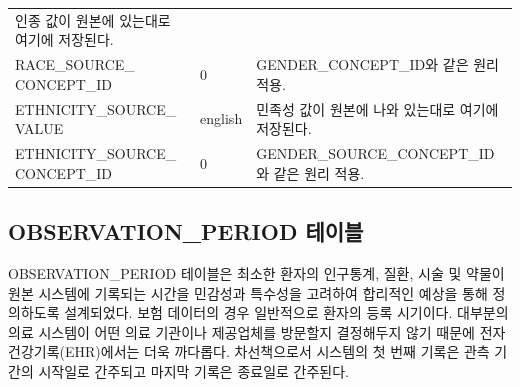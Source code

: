 \documentclass[11pt]{book}
\theoremstyle{definition}
\theoremstyle{definition}
\theoremstyle{definition}
\theoremstyle{remark}
\begin{document}
\begin{longtable}[]{@{}lll@{}}
\begin{minipage}[t]{0.48\columnwidth}
인종 값이 원본에 있는대로 여기에 저장된다.\strut
\end{minipage}\tabularnewline
\begin{minipage}[t]{0.28\columnwidth}\raggedright\strut
RACE\_SOURCE\_ CONCEPT\_ID\strut
\end{minipage} & \begin{minipage}[t]{0.16\columnwidth}\raggedright\strut
0\strut
\end{minipage} & \begin{minipage}[t]{0.48\columnwidth}\raggedright\strut
GENDER\_CONCEPT\_ID와 같은 원리 적용.\strut
\end{minipage}\tabularnewline
\begin{minipage}[t]{0.28\columnwidth}\raggedright\strut
ETHNICITY\_SOURCE\_ VALUE\strut
\end{minipage} & \begin{minipage}[t]{0.16\columnwidth}\raggedright\strut
english\strut
\end{minipage} & \begin{minipage}[t]{0.48\columnwidth}\raggedright\strut
민족성 값이 원본에 나와 있는대로 여기에 저장된다.\strut
\end{minipage}\tabularnewline
\begin{minipage}[t]{0.28\columnwidth}\raggedright\strut
ETHNICITY\_SOURCE\_ CONCEPT\_ID\strut
\end{minipage} & \begin{minipage}[t]{0.16\columnwidth}\raggedright\strut
0\strut
\end{minipage} & \begin{minipage}[t]{0.48\columnwidth}\raggedright\strut
GENDER\_SOURCE\_CONCEPT\_ID와 같은 원리 적용.\strut
\end{minipage}\tabularnewline
\bottomrule
\end{longtable}

\subsection{OBSERVATION\_PERIOD 테이블}\label{observationPeriod}

OBSERVATION\_PERIOD 테이블은 최소한 환자의 인구통계, 질환, 시술 및
약물이 원본 시스템에 기록되는 시간을 민감성과 특수성을 고려하여 합리적인
예상을 통해 정의하도록 설계되었다. 보험 데이터의 경우 일반적으로 환자의
등록 시기이다. 대부분의 의료 시스템이 어떤 의료 기관이나 제공업체를
방문할지 결정해두지 않기 때문에 전자건강기록(EHR)에서는 더욱 까다롭다.
차선책으로서 시스템의 첫 번째 기록은 관측 기간의 시작일로 간주되고
마지막 기록은 종료일로 간주된다.
\end{document}
